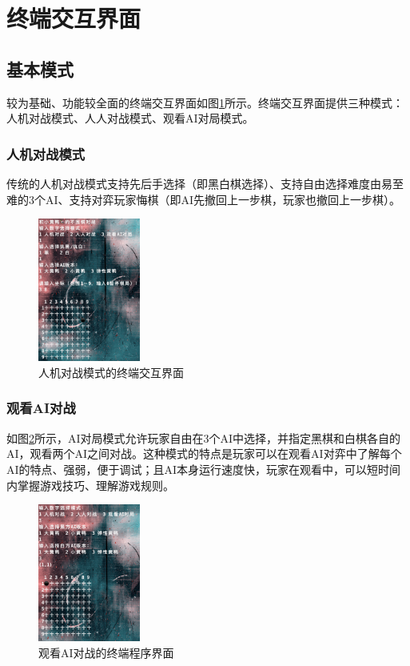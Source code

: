 \documentclass[twocolumn]{article}
\begin{document}
\section{终端交互界面}
\subsection{基本模式}
较为基础、功能较全面的终端交互界面如图\ref{Fig3}所示。终端交互界面提供三种模式：人机对战模式、人人对战模式、观看AI对局模式。
\subsubsection{人机对战模式}
传统的人机对战模式支持先后手选择（即黑白棋选择）、支持自由选择难度由易至难的3个AI、支持对弈玩家悔棋（即AI先撤回上一步棋，玩家也撤回上一步棋）。
\begin{figure}[H]
\centering
\includegraphics[width=0.3\textwidth]{fig5}
\caption{人机对战模式的终端交互界面}
\label{Fig3}
\end{figure}
\subsubsection{观看AI对战}
如图\ref{Fig4}所示，AI对局模式允许玩家自由在3个AI中选择，并指定黑棋和白棋各自的AI，观看两个AI之间对战。这种模式的特点是玩家可以在观看AI对弈中了解每个AI的特点、强弱，便于调试；且AI本身运行速度快，玩家在观看中，可以短时间内掌握游戏技巧、理解游戏规则。
\begin{figure}[H]
\centering
\includegraphics[width=0.3\textwidth]{fig6}
\caption{观看AI对战的终端程序界面}
\label{Fig4}
\end{figure}
\end{document}
